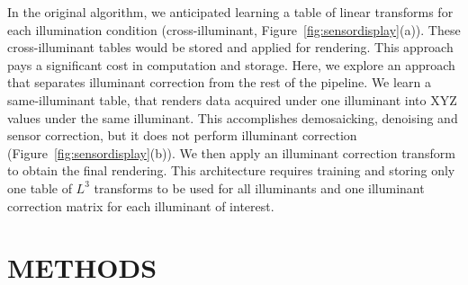\documentclass[]{spie}
\newcommand{\Lcube}{L^3}
\begin{document}
In the original algorithm, we anticipated learning a table of linear transforms for each illumination condition (cross-illuminant, Figure~\ref{fig:sensordisplay}(a)). These cross-illuminant tables would be stored and applied for rendering. This approach pays a significant cost in computation and storage. Here, we explore an approach that separates illuminant correction from the rest of the pipeline. We learn a same-illuminant table, that renders data acquired under one illuminant into XYZ values under the same illuminant. This accomplishes demosaicking, denoising and sensor correction, but it does not perform illuminant correction (Figure~\ref{fig:sensordisplay}(b)). We then apply an illuminant correction transform to obtain the final rendering. This architecture requires training and storing only one table of $\Lcube$ transforms to be used for all illuminants and one illuminant correction matrix for each illuminant of interest. 

\section{METHODS}
\end{document}
